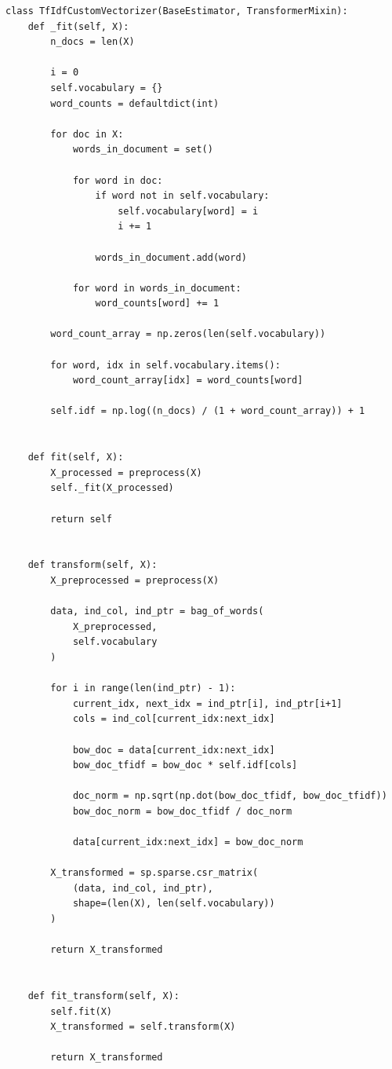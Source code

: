 \documentclass[11pt,a4paper]{article}
\begin{document}
\begin{lstlisting}
class TfIdfCustomVectorizer(BaseEstimator, TransformerMixin):
    def _fit(self, X):
        n_docs = len(X)

        i = 0
        self.vocabulary = {}
        word_counts = defaultdict(int)
        
        for doc in X:
            words_in_document = set()

            for word in doc:
                if word not in self.vocabulary:
                    self.vocabulary[word] = i
                    i += 1
                
                words_in_document.add(word)

            for word in words_in_document:
                word_counts[word] += 1
        
        word_count_array = np.zeros(len(self.vocabulary))
        
        for word, idx in self.vocabulary.items():
            word_count_array[idx] = word_counts[word]

        self.idf = np.log((n_docs) / (1 + word_count_array)) + 1


    def fit(self, X):
        X_processed = preprocess(X)
        self._fit(X_processed)

        return self
    

    def transform(self, X):
        X_preprocessed = preprocess(X)
        
        data, ind_col, ind_ptr = bag_of_words(
        	X_preprocessed,
        	self.vocabulary
        )

        for i in range(len(ind_ptr) - 1):
            current_idx, next_idx = ind_ptr[i], ind_ptr[i+1]
            cols = ind_col[current_idx:next_idx]

            bow_doc = data[current_idx:next_idx]
            bow_doc_tfidf = bow_doc * self.idf[cols]

            doc_norm = np.sqrt(np.dot(bow_doc_tfidf, bow_doc_tfidf))
            bow_doc_norm = bow_doc_tfidf / doc_norm

            data[current_idx:next_idx] = bow_doc_norm

        X_transformed = sp.sparse.csr_matrix(
            (data, ind_col, ind_ptr),
            shape=(len(X), len(self.vocabulary))
        )

        return X_transformed
    

    def fit_transform(self, X):
        self.fit(X)
        X_transformed = self.transform(X)

        return X_transformed
\end{lstlisting}
\end{document}
